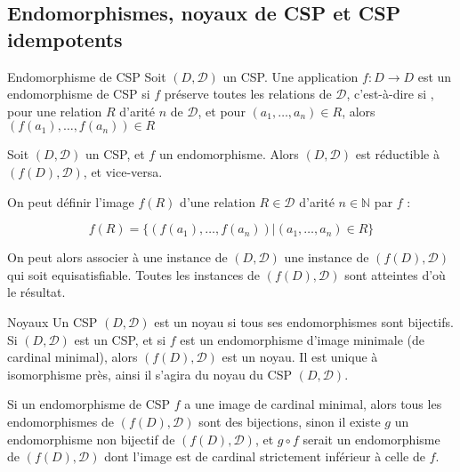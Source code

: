 \subsection{Endomorphismes, noyaux de CSP et CSP idempotents}

\begin{defi}{Endomorphisme de CSP}
    Soit $(D,\mathcal{D})$ un CSP. Une application $f : D \rightarrow D$ est un
    endomorphisme de CSP si $f$ préserve toutes les relations de $\mathcal{D}$,
    c'est-à-dire si , pour une relation $R$ d'arité $n$ de $\mathcal{D}$, et
    pour $(a_1,\dots,a_n) \in R$, alors $(f(a_1),\dots,f(a_n)) \in R$
\end{defi}

\begin{prop}
    Soit $(D,\mathcal{D})$ un CSP, et $f$ un endomorphisme. Alors $(D,\mathcal{D})$
    est réductible à $(f(D),\mathcal{D})$, et vice-versa.
\end{prop}

\begin{pv}
    On peut définir l'image $f(R)$ d'une relation $R \in \mathcal{D}$ d'arité $n
    \in \mathbb{N}$ par $f$ :

    $$ f(R) = \{ (f(a_1),\dots,f(a_n))| (a_1,\dots,a_n) \in R\}$$

    On peut alors associer à une instance de $(D,\mathcal{D})$ une instance de
    $(f(D),\mathcal{D})$ qui soit equisatisfiable. Toutes les instances de
    $(f(D),\mathcal{D})$ sont atteintes d'où le résultat.
\end{pv}

\begin{defi}{Noyaux}
    Un CSP $(D,\mathcal{D})$ est un noyau si tous ses endomorphismes sont
    bijectifs. Si $(D,\mathcal{D})$ est un CSP, et si $f$ est un endomorphisme
    d'image minimale (de cardinal minimal), alors $(f(D),\mathcal{D})$ est un
    noyau. Il est unique à isomorphisme près, ainsi il s'agira du noyau du CSP
    $(D,\mathcal{D})$.
\end{defi}

\begin{pv}
    Si un endomorphisme de CSP $f$ a une image de cardinal minimal, alors tous les
    endomorphismes de $(f(D),\mathcal{D})$ sont des bijections, sinon il existe
    $g$ un endomorphisme non bijectif de $(f(D),\mathcal{D})$, et $g \circ f$
    serait un endomorphisme de $(f(D),\mathcal{D})$ dont l'image est de
    cardinal strictement inférieur à celle de $f$.
\end{pv}


